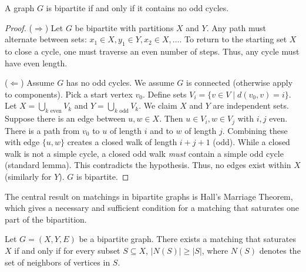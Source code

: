 \begin{theorem}
A graph $G$ is bipartite if and only if it contains no odd cycles.
\end{theorem}

\begin{proof}
(\textbf{$\Rightarrow$}) Let $G$ be bipartite with partitions $X$ and $Y$. Any path must alternate between sets: $x_1 \in X, y_1 \in Y, x_2 \in X, \dots$. To return to the starting set $X$ to close a cycle, one must traverse an even number of steps. Thus, any cycle must have even length.

(\textbf{$\Leftarrow$}) Assume $G$ has no odd cycles. We assume $G$ is connected (otherwise apply to components). Pick a start vertex $v_0$.
Define sets $V_i = \{ v \in V \mid d(v_0, v) = i \}$.
Let $X = \bigcup_{k \text{ even}} V_k$ and $Y = \bigcup_{k \text{ odd}} V_k$.
We claim $X$ and $Y$ are independent sets.
Suppose there is an edge between $u, w \in X$. Then $u \in V_i, w \in V_j$ with $i, j$ even.
There is a path from $v_0$ to $u$ of length $i$ and to $w$ of length $j$. Combining these with edge $\{u, w\}$ creates a closed walk of length $i+j+1$ (odd).
While a closed walk is not a simple cycle, a closed odd walk \textit{must} contain a simple odd cycle (standard lemma). This contradicts the hypothesis.
Thus, no edges exist within $X$ (similarly for $Y$). $G$ is bipartite.
\end{proof}

The central result on matchings in bipartite graphs is Hall's Marriage Theorem, which gives a necessary and sufficient condition for a matching that saturates one part of the bipartition.

\begin{theorem}
Let $G = (X, Y, E)$ be a bipartite graph. There exists a matching that saturates $X$ if and only if for every subset $S \subseteq X$, $|N(S)| \ge |S|$, where $N(S)$ denotes the set of neighbors of vertices in $S$.
\end{theorem}

